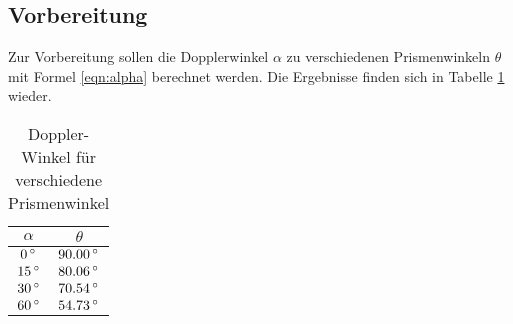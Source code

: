 \subsection{Vorbereitung}
Zur Vorbereitung sollen die Dopplerwinkel $\alpha$ zu verschiedenen Prismenwinkeln
$\theta$
mit Formel \eqref{eqn:alpha} berechnet werden. Die Ergebnisse finden sich in
Tabelle \ref{tab:alpha} wieder.
\begin{table}
  \centering
  \begin{tabular}{c|c}
    \toprule
    $\alpha$ & $\theta$ \\
    \midrule
    $ 0\,\si{\degree}$ & $90.00\,\si{\degree}$ \\
    $15\,\si{\degree}$ & $80.06\,\si{\degree}$ \\
    $30\,\si{\degree}$ & $70.54\,\si{\degree}$ \\
    $60\,\si{\degree}$ & $54.73\,\si{\degree}$ \\
    \bottomrule
  \end{tabular}
  \caption{Doppler-Winkel für verschiedene Prismenwinkel}
  \label{tab:alpha}
\end{table}
